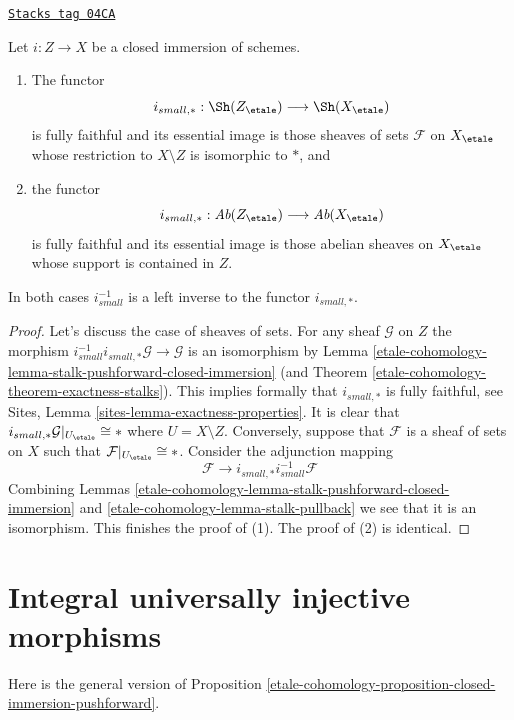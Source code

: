 \begin{proposition}
\label{etale-cohomology-proposition-closed-immersion-pushforward}
\href{https://stacks.math.columbia.edu/tag/04CA}{\texttt{Stacks tag 04CA}}

Let $i : Z \to X$ be a closed immersion of schemes.
\begin{enumerate}
\item The functor
$$
i_{small, *} :
\Sh(Z_\etale)
\longrightarrow
\Sh(X_\etale)
$$
is fully faithful and its essential image is those sheaves of sets
$\mathcal{F}$ on $X_\etale$ whose restriction to $X \setminus Z$ is
isomorphic to $*$, and
\item the functor
$$
i_{small, *} :
\textit{Ab}(Z_\etale)
\longrightarrow
\textit{Ab}(X_\etale)
$$
is fully faithful and its essential image is those abelian sheaves on
$X_\etale$ whose support is contained in $Z$.
\end{enumerate}
In both cases $i_{small}^{-1}$ is a left inverse to the functor
$i_{small, *}$.
\end{proposition}

\begin{proof}
Let's discuss the case of sheaves of sets.
For any sheaf $\mathcal{G}$ on $Z$ the morphism
$i_{small}^{-1}i_{small, *}\mathcal{G} \to \mathcal{G}$
is an isomorphism by
Lemma \ref{etale-cohomology-lemma-stalk-pushforward-closed-immersion}
(and
Theorem \ref{etale-cohomology-theorem-exactness-stalks}).
This implies formally that $i_{small, *}$ is fully faithful, see
Sites, Lemma \ref{sites-lemma-exactness-properties}.
It is clear that $i_{small, *}\mathcal{G}|_{U_\etale} \cong *$
where $U = X \setminus Z$. Conversely, suppose that $\mathcal{F}$
is a sheaf of sets on $X$ such that $\mathcal{F}|_{U_\etale} \cong *$.
Consider the adjunction mapping
$$
\mathcal{F} \longrightarrow i_{small, *}i_{small}^{-1}\mathcal{F}
$$
Combining
Lemmas \ref{etale-cohomology-lemma-stalk-pushforward-closed-immersion} and
\ref{etale-cohomology-lemma-stalk-pullback}
we see that it is an isomorphism. This finishes the proof of (1).
The proof of (2) is identical.
\end{proof}

\section{Integral universally injective morphisms}
\label{etale-cohomology-section-integral-universally-injective}
Here is the general version of
Proposition \ref{etale-cohomology-proposition-closed-immersion-pushforward}.

